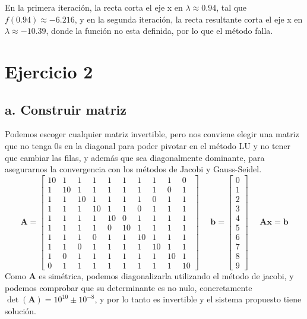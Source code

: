 \documentclass{article}
\begin{document}
En la primera iteración, la recta corta el eje x en $\lambda \approx 0.94$, tal que $f(0.94) \approx -6.216$, y en la segunda iteración, la recta resultante corta el eje x en $\lambda \approx -10.39$, donde la función no esta definida, por lo que el método falla.
\newpage
\section*{Ejercicio 2}
\subsection*{a. Construir matriz}
Podemos escoger cualquier matriz invertible, pero nos conviene elegir una matriz que no tenga 0s en la diagonal para poder pivotar en el método LU y no tener que cambiar las filas, y además que sea diagonalmente dominante, para asegurarnos la convergencia con los métodos de Jacobi y Gauss-Seidel.
\[\mathbf{A} = \left[\begin{matrix}
10 & 1 & 1 & 1 & 1 & 1 & 1 & 1 & 1 & 0 \\
1 & 10 & 1 & 1 & 1 & 1 & 1 & 1 & 0 & 1 \\
1 & 1 & 10 & 1 & 1 & 1 & 1 & 0 & 1 & 1 \\
1 & 1 & 1 & 10 & 1 & 1 & 0 & 1 & 1 & 1 \\
1 & 1 & 1 & 1 & 10 & 0 & 1 & 1 & 1 & 1 \\
1 & 1 & 1 & 1 & 0 & 10 & 1 & 1 & 1 & 1 \\
1 & 1 & 1 & 0 & 1 & 1 & 10 & 1 & 1 & 1 \\
1 & 1 & 0 & 1 & 1 & 1 & 1 & 10 & 1 & 1 \\
1 & 0 & 1 & 1 & 1 & 1 & 1 & 1 & 10 & 1 \\
0 & 1 & 1 & 1 & 1 & 1 & 1 & 1 & 1 & 10 
\end{matrix}\right]\ \ \ \ \ \ \mathbf{b} = \left[\begin{matrix}
	0 \\
	1 \\
	2 \\
	3 \\
	4 \\
	5 \\
	6 \\
	7 \\
	8 \\
	9 
	\end{matrix}\right]\ \ \ \ \ \ \mathbf{A} \mathbf{x} = \mathbf{b}\]
Como $\mathbf{A}$ es simétrica, podemos diagonalizarla utilizando el método de jacobi, y podemos comprobar que su determinante es no nulo, concretamente $\det(\mathbf{A}) = 10^{10} \pm 10^{-8}$, y por lo tanto es invertible y el sistema propuesto tiene solución.
\end{document}
